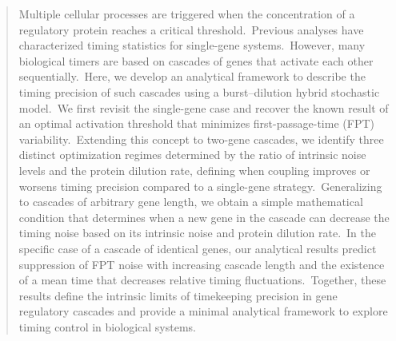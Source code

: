 \documentclass[aps,prb,reprint,superscriptaddress]{revtex4-2}
\begin{document}
\begin{abstract}

Multiple cellular processes are triggered when the concentration of a regulatory protein reaches a critical threshold.~Previous analyses have characterized timing statistics for single-gene systems.~However, many biological timers are based on cascades of genes that activate each other sequentially.~Here, we develop an analytical framework to describe the timing precision of such cascades using a burst–dilution hybrid stochastic model.~We first revisit the single-gene case and recover the known result of an optimal activation threshold that minimizes first-passage-time (FPT) variability.~Extending this concept to two-gene cascades, we identify three distinct optimization regimes determined by the ratio of intrinsic noise levels and the protein dilution rate, defining when coupling improves or worsens timing precision compared to a single-gene strategy.~Generalizing to cascades of arbitrary gene length, we obtain a simple mathematical condition that determines when a new gene in the cascade can decrease the timing noise based on its intrinsic noise and protein dilution rate.~In the specific case of a cascade of identical genes, our analytical results predict suppression of FPT noise with increasing cascade length and the existence of a mean time that decreases relative timing fluctuations.~Together, these results define the intrinsic limits of timekeeping precision in gene regulatory cascades and provide a minimal analytical framework to explore timing control in biological systems.



\end{abstract}
\end{document}
